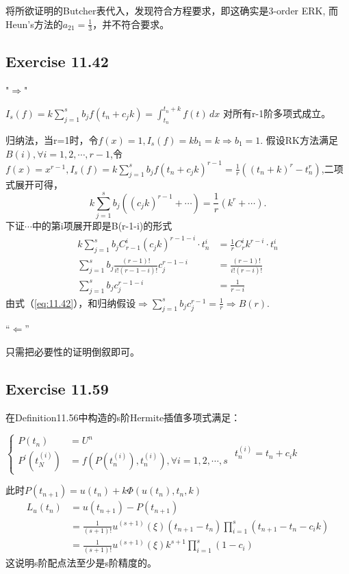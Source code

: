 \documentclass[UTF8]{ctexart}
\begin{document}
将所欲证明的Butcher表代入，发现符合方程要求，即这确实是3-order ERK,
而Heun's方法的$a_{21} = \frac{1}{3}$，并不符合要求。

\subsection*{Exercise 11.42}
"$\Rightarrow$"

$I_s(f) = k\sum_{j=1}^{s}b_jf(t_n+c_jk) = \int_{t_n}^{t_n+k} f(t) \,dx $
对所有r-1阶多项式成立。

归纳法，当r=1时，令$f(x) = 1, I_s(f) = kb_1 = k \Rightarrow b_1 = 1$.
假设RK方法满足$B(i), \forall i = 1,2,\cdots,r-1$,令$f(x) = x^{r-1}, 
I_s(f) = k\sum_{j=1}^{s}b_jf(t_n+c_jk)^{r-1} = \frac{1}{r}((t_n+k)^r - t_n^r)$,二项式展开可得，
\begin{equation}
    \label{eq:11.42}
    k\sum_{j=1}^{s}b_j((c_jk)^{r-1} + \cdots) = \frac{1}{r}(k^r + \cdots).
\end{equation}
下证$\cdots$中的第i项展开即是B(r-1-i)的形式
\begin{align*}
    k\sum_{j=1}^{s}b_jC_{r-1}^i(c_jk)^{r-1-i}\cdot t_n^i &= \frac{1}{r}C_r^i k^{r-i} \cdot t_n^i \\
    \sum_{j=1}^{s}b_j\frac{(r-1)!}{i!(r-1-i)!}c_j^{r-1-i} &= \frac{(r-1)!}{i!(r-i)!} \\
    \sum_{j=1}^{s}b_jc_j^{r-1-i} &= \frac{1}{r-i}
\end{align*}
由式（\ref{eq:11.42}），和归纳假设$\Rightarrow \sum_{j=1}^{s}b_jc_j^{r-1} = \frac{1}{r} \Rightarrow B(r)$.

“$\Leftarrow$” 

只需把必要性的证明倒叙即可。


\subsection*{Exercise 11.59}
在Definition11.56中构造的s阶Hermite插值多项式满足：

$
\left\{
    \begin{aligned}
        P(t_n) &= U^n \\
        P^{'}(t_N^{(i)}) &= f(P(t_n^{(i)}), t_n^{(i)}), \forall i = 1,2,\cdots,s
    \end{aligned}
\right.
$ $t_n^{(i)} = t_n + c_ik$

此时$P(t_{n+1}) = u(t_n) + k\Phi(u(t_n), t_n, k)$
\begin{align*}
    L_u(t_n) &= u(t_{n+1}) - P(t_{n+1}) \\
             &= \frac{1}{(s+1)!}u^{(s+1)}(\xi)(t_{n+1} - t_n)\prod _{i=1}^{s} (t_{n+1} - t_n - c_ik) \\
             &= \frac{1}{(s+1)!}u^{(s+1)}(\xi)k^{s+1}\prod_{i=1}^{s}(1 - c_i)
\end{align*}
这说明s阶配点法至少是s阶精度的。
\end{document}
